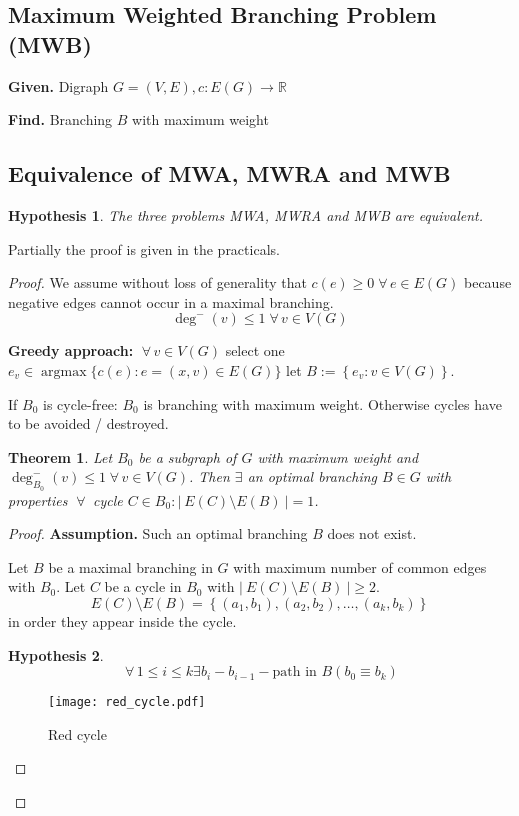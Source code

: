 \documentclass{article}
\newtheorem{theorem}{Theorem}
\newtheorem*{hypothesis}{Hypothesis}
\newcommand{\card}[1]{\left|\:\!#1\:\!\right|}
\newcommand{\set}[1]{\left\{#1\right\}}
\newcommand{\given}[1]{\textbf{Given.} #1\par}
\newcommand{\find}[1]{\textbf{Find.} #1\par}
\newcommand{\fall}{\;\forall\,}
\DeclareMathOperator{\argmax}{argmax}
\begin{document}
\subsection{Maximum Weighted Branching Problem (MWB)}
%
\given{Digraph $G = (V, E), c: E(G) \rightarrow \mathbb{R}$}
\find{Branching $B$ with maximum weight}
%
\subsection{Equivalence of MWA, MWRA and MWB}
%
\begin{hypothesis}
  The three problems MWA, MWRA and MWB are equivalent.
\end{hypothesis}

Partially the proof is given in the practicals.

\begin{proof}
We assume without loss of generality that $c(e) \geq 0 \fall e \in E(G)$ because negative edges cannot occur in a maximal branching.
\[
    \deg^-(v) \leq 1 \fall v \in V(G)
\]

\textbf{Greedy approach:} $\fall v \in V(G)$ select one $e_v \in \argmax\{c(e): e = (x, v) \in E(G)\}$ let $B := \set{e_v: v \in V(G)}$.

If $B_0$ is cycle-free: $B_0$ is branching with maximum weight. Otherwise cycles have to be avoided / destroyed.

\begin{theorem}\label{lemma-2.10}
  Let $B_0$ be a subgraph of $G$ with maximum weight and $\deg^-_{B_0}(v) \leq 1 \fall v \in V(G)$.
  Then $\exists$ an optimal branching $B \in G$ with properties $\fall$ cycle $C \in B_0: \card{E(C) \setminus E(B)} = 1$.
\end{theorem}

\begin{proof}
\textbf{Assumption.}
  Such an optimal branching $B$ does not exist.

Let $B$ be a maximal branching in $G$ with maximum number of common edges with $B_0$. Let $C$ be a cycle in $B_0$ with $\card{E(C) \setminus E(B)} \geq 2$.
\[
  E(C) \setminus E(B) = \set{(a_1, b_1), (a_2, b_2), \ldots, (a_k, b_k)}
\]
in order they appear inside the cycle.

\begin{hypothesis}
  \[
    \fall 1 \leq i \leq k \exists b_i-b_{i-1}-\text{path in } B (b_0 \equiv b_k)
  \]
\end{hypothesis}

\begin{figure}[h]
  \begin{center}
    \texttt{[image: red\_cycle.pdf]}
    \caption{Red cycle}
  \end{center}
\end{figure}


\end{proof}
\end{proof}
\end{document}
